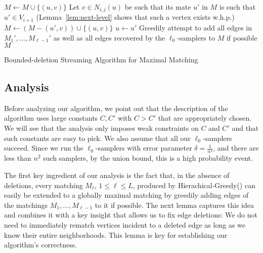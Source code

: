 \documentclass[11pt,a4paper]{article}
\begin{document}
\begin{algorithm}[h!]
\begin{algorithmic}[1]
                \STATE $M \gets M \cup \{(u,v) \}$
            \ELSE
                \STATE Let $v \in N_{i,j}(u)$ be such that its mate $u'$ in $M$ is such that $u' \in V_{i+1}$ (Lemma~\ref{lem:next-level} shows that such a vertex exists w.h.p.)
                \STATE $M \gets (M - (u', v)) \cup \{(u,v) \}$
                \STATE $u \gets u'$
            \ENDIF
        \ENDFOR \label{line:end-loop-repair}
        \STATE Greedily attempt to add all edges in $M_1', \dots, M_{\ell - 1}'$ as well as all edges recovered by the $\ell_0$-samplers to $M$ if possible \label{line:final-fix}
    \ENDFOR
    \RETURN $M$
    \end{algorithmic}
    \caption{Bounded-deletion Streaming Algorithm for \textsf{Maximal Matching}\label{alg:maximal}}
\end{algorithm}

\subsection{Analysis}
Before analyzing our algorithm, we point out that the description of the algorithm uses large constants $C,C'$ with $C > C'$ that are appropriately chosen. We will see that the analysis only imposes weak constraints on $C$ and $C'$ and that such constants are easy to pick.
We also assume that all our $\ell_0$-samplers succeed. Since we run the $\ell_0$-samplers with error parameter $\delta = \frac{1}{n^4}$, and there are less than $n^2$ such samplers, by the union bound, this is a high probability event.

The first key ingredient of our analysis is the fact that, in the absence of deletions, every matching $M_\ell$, $1 \le \ell \le L$, produced by \textsf{Hierachical-Greedy}() can easily be extended to a globally maximal matching by greedily adding edges of the matchings $M_1, \dots, M_{\ell-1}$ to it if possible.  
The next lemma captures this idea and combines it with a key insight that allows us to fix edge deletions: We do not need to immediately rematch vertices incident to a deleted edge as long as we know their entire neighborhoods. This lemma is key for establishing our algorithm's correctness.
\end{document}
